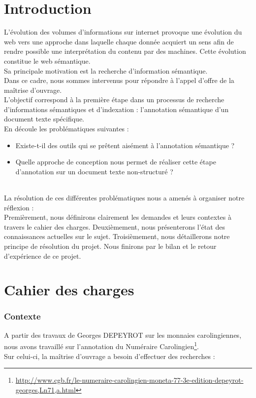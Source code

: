 \documentclass[a4paper, 11pt]{report}
\begin{document}
\part{Introduction}
L'évolution des volumes d'informations sur internet provoque une évolution du web vers une approche dans laquelle chaque donnée acquiert un sens afin de rendre possible une interprétation du contenu par des machines. Cette évolution constitue le web sémantique.\\
Sa principale motivation  est la recherche d’information sémantique.\\

Dans ce cadre, nous sommes intervenus pour répondre à l'appel d'offre de la maîtrise d'ouvrage. \\
L'objectif correspond à la première étape dans un processus de recherche d'informations sémantiques et d'indexation : l'annotation sémantique d'un document texte spécifique.\\

En découle les problématiques suivantes :
\begin{itemize}
\item Existe-t-il des outils qui se prêtent aisément à l'annotation sémantique ?
\item Quelle approche de conception nous permet de réaliser cette étape d'annotation sur un document texte non-structuré ?
\end{itemize}
	~\\
	
La résolution de ces différentes problématiques nous a amenés à organiser notre réflexion :\\
Premièrement, nous définirons clairement les demandes et leurs contextes à travers le cahier des charges. Deuxièmement, nous présenterons l'état des connaissances actuelles sur le sujet. Troisièmement, nous détaillerons notre principe de résolution du projet. Nous finirons par le bilan et le retour d’expérience de ce projet.
\part{Cahier des charges}
	\section{Contexte}

A partir des travaux de Georges DEPEYROT sur les monnaies carolingiennes, nous avons travaillé sur l'annotation du Numéraire Carolingien\footnote{\url{http://www.cgb.fr/le-numeraire-carolingien-moneta-77-3e-edition-depeyrot-georges,Ln71,a.html}}.\\
Sur celui-ci, la maîtrise d'ouvrage a besoin d'effectuer des recherches :
\end{document}
